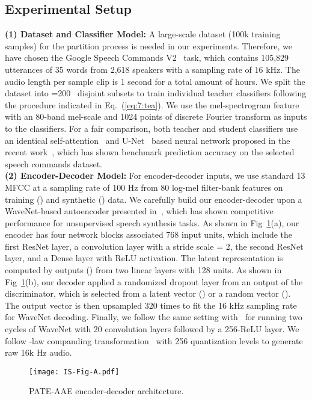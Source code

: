 \documentclass[a4paper]{article}
\begin{document}
\subsection{Experimental Setup}
\textbf{(1) Dataset and Classifier Model:} A large-scale dataset (100k training samples)  for the partition process is needed in our experiments. Therefore, we have chosen the Google Speech Commands V2~\cite{warden2018speech} task, which contains 105,829 utterances of 35 words from 2,618 speakers with a sampling rate of 16 kHz. The audio length per sample clip is 1 second for a total amount of  hours. We split the dataset into =200~\cite{jordon2019pate} disjoint subsets to train individual teacher classifiers following the procedure indicated in Eq.~(\ref{eq:7:tea}). We use the mel-spectrogram feature with an 80-band mel-scale and 1024 points of discrete Fourier transform as inputs to the classifiers. For a fair comparison, both teacher and student classifiers use an identical self-attention~\cite{vaswani2017attention} and U-Net~\cite{ronneberger2015u} based neural network proposed in the recent work~\cite{yang2020decentralizing}, which has shown benchmark prediction accuracy on the selected speech commands dataset.
\\
\textbf{(2) Encoder-Decoder Model:}
For encoder-decoder inputs, we use standard 13 MFCC at a sampling rate of 100 Hz from 80 log-mel filter-bank features on training () and synthetic () data. We carefully build our encoder-decoder upon a WaveNet-based autoencoder presented in~\cite{chorowski2019unsupervised}, which has shown competitive performance for unsupervised speech synthesis tasks. As shown in Fig~\ref{fig:a}(a), our encoder has four network blocks associated 768 input units, which include the first ResNet layer, a convolution layer with a stride scale = 2, the second ResNet layer, and a Dense layer with ReLU activation. The latent representation  is computed by outputs () from two linear layers with 128 units. As shown in Fig~\ref{fig:a}(b), our decoder applied a randomized dropout layer from an output of the discriminator, which is selected from a latent vector () or a random vector (). The output vector is then upsampled 320 times to fit the 16 kHz sampling rate for WaveNet decoding. Finally, we follow the same setting with~\cite{chorowski2019unsupervised} for running two cycles of WaveNet with 20 convolution layers followed by a 256-ReLU layer. We follow -law companding transformation~\cite{recommendation1988pulse, oord2016wavenet} with 256 quantization levels to generate raw 16k Hz audio.
\begin{figure}[ht!]
    \centering
    \texttt{[image: IS-Fig-A.pdf]}
    \caption{PATE-AAE encoder-decoder architecture. }
    \label{fig:a}
\end{figure}
\end{document}
